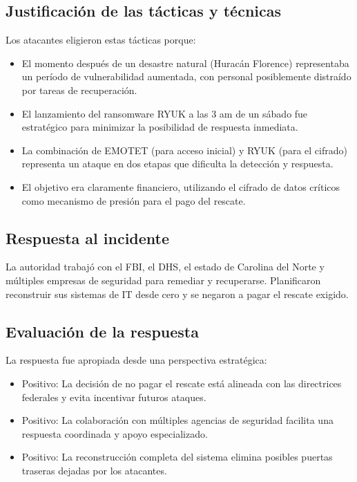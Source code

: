 \subsection{Justificación de las tácticas y técnicas}
Los atacantes eligieron estas tácticas porque:

\begin{itemize}
    \item El momento después de un desastre natural (Huracán Florence) representaba un período de vulnerabilidad aumentada, con personal posiblemente distraído por tareas de recuperación.
    
    \item El lanzamiento del ransomware RYUK a las 3 am de un sábado fue estratégico para minimizar la posibilidad de respuesta inmediata.
    
    \item La combinación de EMOTET (para acceso inicial) y RYUK (para el cifrado) representa un ataque en dos etapas que dificulta la detección y respuesta.
    
    \item El objetivo era claramente financiero, utilizando el cifrado de datos críticos como mecanismo de presión para el pago del rescate.
\end{itemize}

\subsection{Respuesta al incidente}
La autoridad trabajó con el FBI, el DHS, el estado de Carolina del Norte y múltiples empresas de seguridad para remediar y recuperarse. Planificaron reconstruir sus sistemas de IT desde cero y se negaron a pagar el rescate exigido.

\subsection{Evaluación de la respuesta}
La respuesta fue apropiada desde una perspectiva estratégica:

\begin{itemize}
    \item Positivo: La decisión de no pagar el rescate está alineada con las directrices federales y evita incentivar futuros ataques.
    \item Positivo: La colaboración con múltiples agencias de seguridad facilita una respuesta coordinada y apoyo especializado.
    \item Positivo: La reconstrucción completa del sistema elimina posibles puertas traseras dejadas por los atacantes.
\end{itemize}

